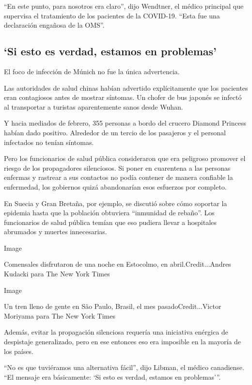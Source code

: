 ``En este punto, para nosotros era claro'', dijo Wendtner, el médico
principal que supervisa el tratamiento de los pacientes de la COVID-19.
``Esta fue una declaración engañosa de la OMS''.

\hypertarget{si-esto-es-verdad-estamos-en-problemas}{%
\subsection{`Si esto es verdad, estamos en
problemas'}\label{si-esto-es-verdad-estamos-en-problemas}}

El foco de infección de Múnich no fue la única advertencia.

Las autoridades de salud chinas habían advertido explícitamente que los
pacientes eran contagiosos antes de mostrar síntomas. Un chofer de bus
japonés se infectó al transportar a turistas aparentemente sanos desde
Wuhan.

Y hacia mediados de febrero, 355 personas a bordo del crucero Diamond
Princess habían dado positivo. Alrededor de un tercio de los pasajeros y
el personal infectados no tenían síntomas.

Pero los funcionarios de salud pública consideraron que era peligroso
promover el riesgo de los propagadores silenciosos. Si poner en
cuarentena a las personas enfermas y rastrear a sus contactos no podía
contener de manera confiable la enfermedad, los gobiernos quizá
abandonarían esos esfuerzos por completo.

En Suecia y Gran Bretaña, por ejemplo, se discutió sobre cómo soportar
la epidemia hasta que la población obtuviera ``inmunidad de rebaño''.
Los funcionarios de salud pública temían que eso pudiera llevar a
hospitales abrumados y muertes innecesarias.

Image

Comensales disfrutaron de una noche en Estocolmo, en
abril.Credit...Andres Kudacki para The New York Times

Image

Un tren lleno de gente en São Paulo, Brasil, el mes
pasadoCredit...Victor Moriyama para The New York Times

Además, evitar la propagación silenciosa requería una iniciativa
enérgica de despistaje generalizado, pero en ese entonces eso era
imposible en la mayoría de los países.

``No es que tuviéramos una alternativa fácil'', dijo Libman, el médico
canadiense. ``El mensaje era básicamente: `Si esto es verdad, estamos en
problemas'''.

